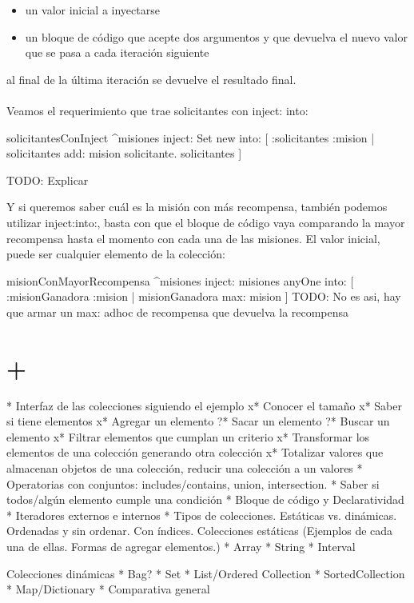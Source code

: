 \documentclass[a4paper,12pt]{book}
\begin{document}
\begin{itemize}
 \item un valor inicial a inyectarse 
 \item un bloque de código que acepte dos argumentos y que devuelva el nuevo valor que se pasa a cada iteración siguiente
\end{itemize}

al final de la última iteración se devuelve el resultado final.
\\
\\
Veamos el requerimiento que trae solicitantes con inject: into:

\begin{code}
solicitantesConInject
   ^misiones inject: Set new into: [ :solicitantes :mision | 
	solicitantes add: mision solicitante. 
	solicitantes  ] 
\end{code}

TODO: Explicar

Y si queremos saber cuál es la misión con más recompensa, también podemos utilizar inject:into:, basta
con que el bloque de código vaya comparando la mayor recompensa hasta el momento con cada una de las misiones.
El valor inicial, puede ser cualquier elemento de la colección:

\begin{code}
misionConMayorRecompensa
   ^misiones inject: misiones anyOne into: [ :misionGanadora :mision | misionGanadora max: mision ] 
TODO: No es asi, hay que armar un max: adhoc de recompensa que devuelva la recompensa   
\end{code}

\section{+}
* Interfaz de las colecciones siguiendo el ejemplo
  x* Conocer el tamaño
  x* Saber si tiene elementos
  x* Agregar un elemento
  ?* Sacar un elemento
  ?* Buscar un elemento
  x* Filtrar elementos que cumplan un criterio
  x* Transformar los elementos de una colección generando otra colección
  x* Totalizar valores que almacenan objetos de una colección, reducir una colección a un valores
  * Operatorias con conjuntos: includes/contains, union, intersection.
  * Saber si todos/algún elemento cumple una condición
  * Bloque de código y Declaratividad
* Iteradores externos e internos
* Tipos de colecciones. Estáticas vs. dinámicas. Ordenadas y sin ordenar. Con índices.
  Colecciones estáticas (Ejemplos de cada una de ellas. Formas de agregar elementos.)
  * Array
  * String
  * Interval
  
  Colecciones dinámicas
  * Bag?
  * Set
  * List/Ordered Collection
  * SortedCollection
  * Map/Dictionary
  * Comparativa general

  
  
\end{document}
